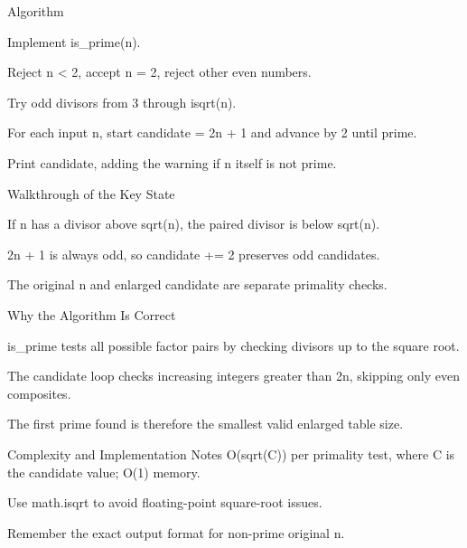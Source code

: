 \documentclass[aspectratio=169,11pt]{beamer}
\begin{document}
\begin{frame}{Algorithm}
\begin{tightitemize}
  \item Implement is\_prime(n).
  \item Reject n < 2, accept n = 2, reject other even numbers.
  \item Try odd divisors from 3 through isqrt(n).
  \item For each input n, start candidate = 2n + 1 and advance by 2 until prime.
  \item Print candidate, adding the warning if n itself is not prime.
\end{tightitemize}
\end{frame}

\begin{frame}{Walkthrough of the Key State}
\begin{tightitemize}
  \item If n has a divisor above sqrt(n), the paired divisor is below sqrt(n).
  \item 2n + 1 is always odd, so candidate += 2 preserves odd candidates.
  \item The original n and enlarged candidate are separate primality checks.
\end{tightitemize}
\end{frame}

\begin{frame}{Why the Algorithm Is Correct}
\begin{tightitemize}
  \item is\_prime tests all possible factor pairs by checking divisors up to the square root.
  \item The candidate loop checks increasing integers greater than 2n, skipping only even composites.
  \item The first prime found is therefore the smallest valid enlarged table size.
\end{tightitemize}
\end{frame}

\begin{frame}{Complexity and Implementation Notes}
\small
{} O(sqrt(C)) per primality test, where C is the candidate value; O(1) memory.

\vspace{0.3cm}
\begin{tightitemize}
  \item Use math.isqrt to avoid floating-point square-root issues.
  \item Remember the exact output format for non-prime original n.
\end{tightitemize}
\end{frame}
\end{document}

